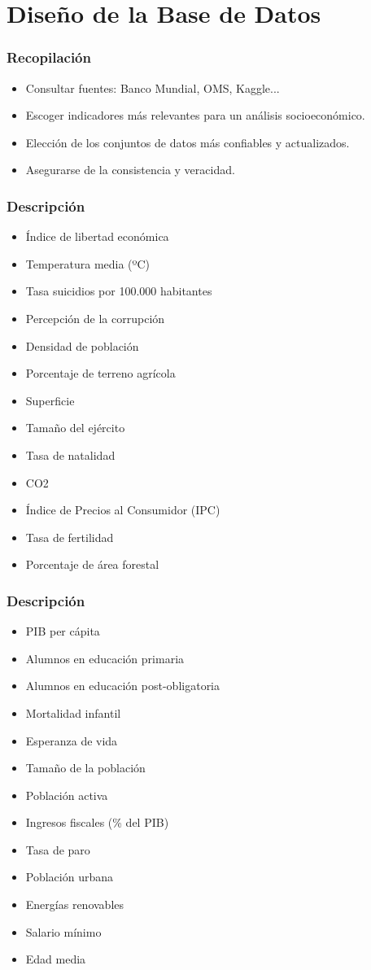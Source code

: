 \documentclass{beamer}
\newcommand{\slideauthor}[1]{\def\insertslideauthor{#1}}
\newcommand{\insertslideauthor}{}
\begin{document}
\section{Diseño de la Base de Datos}
\begin{frame}
\frametitle{Recopilación}
\slideauthor{Autor 2}
\begin{itemize}
    \item Consultar fuentes: Banco Mundial, OMS, Kaggle...
    \item Escoger indicadores más relevantes para un análisis socioeconómico.
    \item Elección de los conjuntos de datos más confiables y actualizados.
    \item Asegurarse de la consistencia y veracidad.
\end{itemize}
\end{frame}
\begin{frame}
\frametitle{Descripción}
\slideauthor{Autor 2}
\begin{itemize}
    \item Índice de libertad económica
    \item Temperatura media (ºC)
    \item Tasa suicidios por 100.000 habitantes
    \item Percepción de la corrupción
    \item Densidad de población
    \item Porcentaje de terreno agrícola
    \item Superficie
    \item Tamaño del ejército
    \item Tasa de natalidad
    \item CO2
    \item Índice de Precios al Consumidor (IPC)
    \item Tasa de fertilidad
    \item Porcentaje de área forestal
\end{itemize}
\end{frame}
\begin{frame}
\frametitle{Descripción}
\slideauthor{Autor 2}
\begin{itemize}
    \item PIB per cápita
    \item Alumnos en educación primaria
    \item Alumnos en educación post-obligatoria
    \item Mortalidad infantil
    \item Esperanza de vida
    \item Tamaño de la población
    \item Población activa
    \item Ingresos fiscales (\% del PIB)
    \item Tasa de paro
    \item Población urbana
    \item Energías renovables
    \item Salario mínimo
    \item Edad media
\end{itemize}
\end{frame}
\end{document}
